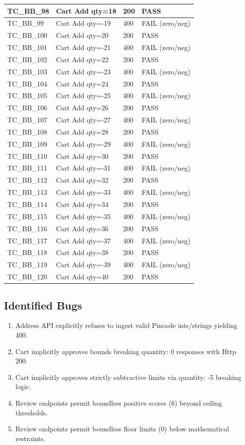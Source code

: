 \documentclass{article}
\begin{document}
\begin{longtable}{|p{2cm}|p{8cm}|p{3cm}|p{2cm}|}
TC\_BB\_98 & Cart Add qty=18 & 200 & PASS \\
\hline
TC\_BB\_99 & Cart Add qty=-19 & 400 & FAIL (zero/neg) \\
\hline
TC\_BB\_100 & Cart Add qty=20 & 200 & PASS \\
\hline
TC\_BB\_101 & Cart Add qty=-21 & 400 & FAIL (zero/neg) \\
\hline
TC\_BB\_102 & Cart Add qty=22 & 200 & PASS \\
\hline
TC\_BB\_103 & Cart Add qty=-23 & 400 & FAIL (zero/neg) \\
\hline
TC\_BB\_104 & Cart Add qty=24 & 200 & PASS \\
\hline
TC\_BB\_105 & Cart Add qty=-25 & 400 & FAIL (zero/neg) \\
\hline
TC\_BB\_106 & Cart Add qty=26 & 200 & PASS \\
\hline
TC\_BB\_107 & Cart Add qty=-27 & 400 & FAIL (zero/neg) \\
\hline
TC\_BB\_108 & Cart Add qty=28 & 200 & PASS \\
\hline
TC\_BB\_109 & Cart Add qty=-29 & 400 & FAIL (zero/neg) \\
\hline
TC\_BB\_110 & Cart Add qty=30 & 200 & PASS \\
\hline
TC\_BB\_111 & Cart Add qty=-31 & 400 & FAIL (zero/neg) \\
\hline
TC\_BB\_112 & Cart Add qty=32 & 200 & PASS \\
\hline
TC\_BB\_113 & Cart Add qty=-33 & 400 & FAIL (zero/neg) \\
\hline
TC\_BB\_114 & Cart Add qty=34 & 200 & PASS \\
\hline
TC\_BB\_115 & Cart Add qty=-35 & 400 & FAIL (zero/neg) \\
\hline
TC\_BB\_116 & Cart Add qty=36 & 200 & PASS \\
\hline
TC\_BB\_117 & Cart Add qty=-37 & 400 & FAIL (zero/neg) \\
\hline
TC\_BB\_118 & Cart Add qty=38 & 200 & PASS \\
\hline
TC\_BB\_119 & Cart Add qty=-39 & 400 & FAIL (zero/neg) \\
\hline
TC\_BB\_120 & Cart Add qty=40 & 200 & PASS \\
\hline
\end{longtable}

\subsection*{Identified Bugs}
\begin{enumerate}
\item Address API explicitly refuses to ingest valid Pincode ints/strings yielding 400.
\item Cart implicitly approves bounds breaking quantity: 0 responses with Http 200.
\item Cart implicitly approves strictly subtractive limits via quantity: -5 breaking logic.
\item Review endpoints permit boundless positive scores (6) beyond ceiling thresholds.
\item Review endpoints permit boundless floor limits (0) below mathematical restraints.
\end{enumerate}
\end{document}

